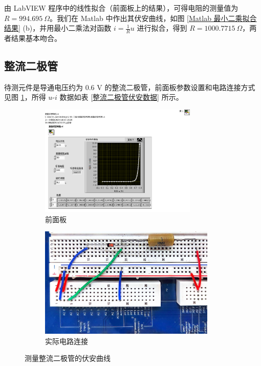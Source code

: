 \documentclass[UTF8]{article}
\def\kO{\ \mathrm{K}\Omega}
\theoremstyle{MyLineTheoremStyle} %
\theoremstyle{MyBlockTheoremStyle} %
\theoremstyle{MySubsubsectionStyle} %
\begin{document}
由 LabVIEW 程序中的线性拟合（前面板上的结果），可得电阻的测量值为 $R = 994.695\ \Omega$。我们在 Matlab 中作出其伏安曲线，如图 \ref{Matlab 最小二乘拟合结果} (b)，并用最小二乘法对函数 $i = \frac{1}{R}u$ 进行拟合，得到 $R = 1000.7715 \ \Omega$，两者结果基本吻合。


\newpage
\subsection{整流二极管}

待测元件是导通电压约为 0.6 V 的整流二极管，前面板参数设置和电路连接方式见图 \ref{测量整流二极管的伏安曲线}，所得 $u$-$i$ 数据如表 \ref{整流二极管伏安数据} 所示。

\begin{figure}[H]\centering
    \begin{subfigure}[b]{0.45\columnwidth}\centering
        \includegraphics[height=150pt]{assets/测量伏安曲线__整流二极管.pdf}
        \caption{前面板}
    \end{subfigure}\hfill
    \begin{subfigure}[b]{0.55\columnwidth}\centering
        \includegraphics[height=150pt]{assets/测量伏安曲线__整流二极管.jpg}
        \caption{实际电路连接}
    \end{subfigure}
    \caption{测量整流二极管的伏安曲线}
    \label{测量整流二极管的伏安曲线}
\end{figure}
\end{document}
